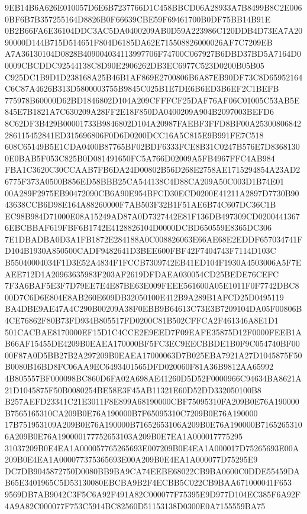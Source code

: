 \documentclass[UTF8,fontset=fandol,zihao=-4,a4paper]{ctexart}
\begin{document}
{{9EB14B6A626E010057D6E6B7237766D1C458BBCD06A28933A7B8499B8C2E0060BF6B7B357255164D8826B0F66639CBE59F69461700B0DF75BB14B91E
0B2B66FA6E36104DDC3AC5DA0400209AB0D59A223986C120DDB4D73EA7A2090000D144B715D514651F804D6185DA62E715508826000026AF7C7209EB
A7A36130104D0828B409004034113997706F74700C067927B6DBD37BD5A7164D00009CBCDDC92544138C8D90E2906262DB3EC6977C523D0200B05B05
C925DC1B9D1D238168A25B46B1AF869E2700806B6A87EB90DF73C8D65952164C6C87A4626B313D5800003755B9845C025B1E7DE6B6ED3B6EF2C1BEFB
775978B60000D62BD1846802D104A209CFFFCF25DAF76AF06C01005C53AB5E845E7B1821A7C630209A28FF2E18F850DA0400209A904B2097003BEFD6
8C62DF3B429B00001733B9846802D104A20987FAEBF3FFD8BF00A25300806842286115452841ED315696806F0D6D0200DCC16A5C815E9B991FE7C518
608C65149B5E1CDA0400B87765BF02BDF6333FCE8B31C0247B576E7D83681300E0BAB5F053C825B0D081491650FC5A766D02009A5FB4967FFC4AB984
FBA1C3620C30CCAAB7FB6DA24D00802B56D268E2758AE1715294854A23AD26775F373A0500B856ED58BBB25CA544138C4D88CA209A50C003D1B74E01
00A289F2975EB90472090CB6A90E954BFCD30ECD0200E41211A2897D7730B9043638CCB6D98E164A88260000F7AB503F32B1F51AE6B74C607DC36C1B
EC98B984D71000E08A15249AD87A0D7327442E81F136DB497309CD02004413676EBCBBAF619FBF6B1742E4128826104D0000DCBD650559E8365DC306
7E1DBADBA0D3A1FB1872E284188A0C008826063E66AE68E2EDDF657034741FD104B1930A850500CADF9482641D3BEE600FBF42F7404743F7114D103C
B55040004034F1D3E52A4834F1FCCB7309742EB41ED104F1930A4503006A5F7EAEE712D1A20963635983F203AF2619DFDAEA030054CD25BEDE76CEFC
7F3A6BAF5E3F7D79EE7E4E87BE63E009FEEE561600A05E1011F0F7742DBC800D7C6D6E804E8AB260E609DB32050100E412B9A289B1AFCD25D0495119
BA4DBE9AE47A4C290B00209A38F0EBB9B64613C73E3B7209104DA05F00806B4CE76862F80B73FD934B805517FD0200C81B502CFFCA2F461346A8E1D1
501CACBAE8170000EF15D1C4CCE2E9EED7F09EAFE35875D12F0000FEEB1AB66AF15455DE4209B0EAEA170000BF5FC3EC9EECBBDE1B0F9C054740BF00
00F87A0D5BB27B2A297209B0EAEA17000063D7B025EBA7921A27D1045875F50B0080B16BD8FC06AA9EC6493401565DFD020060F81A36B9812AA65992
4B805557BF000098BC860D6FA02A698AE41260D5D52F0000966C94634BA8621A21D1045875F50B0080254BE58E3F45AB11321E60D52DD332050100B8
B257AEFD23341C21E3011F8E899A68190000CBF75095310FA209B0E76A190000B7565165310CA209B0E76A190000B7F65095310C7209B0E76A190000
17B751953109A209B0E76A190000B71652653106A209B0E76A190000B71652653106A209B0E76A190000177752653103A209B0E7EA1A000017775295
31037209B0E4EA1A000057765265693E007209B0E4EA1A000017D75265693E00A209B0E4EA1A000077375365693E00A209B0E4EA1A000077D75295E9
DC7DB9045872750D0080BB9BA9CA74EEBE68022CB9BA0600C0DDE55459DAB65E3401965C5D53130080EBCBA9B2F4ECBB5C022CB9BAA671000041F653
9569DB7AB9042C3F5C6A92F491A82C000077F75395E9D977D104EC385F6A92F4A9A82C000077F753C5914BC82560D51153138D0300E0A7155559BA75
}}
\end{document}
